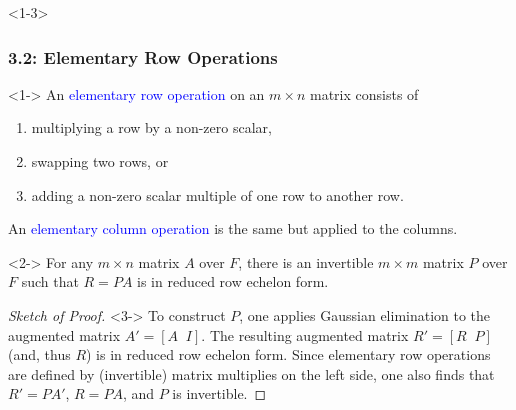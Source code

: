 \documentclass[10pt,english,aspectratio=169]{beamer}
\begin{document}
\begin{frame}

\end{frame}

\begin{frame}<1-3> \frametitle{3.2: Elementary Row Operations}

\vspace{-1.5mm}

\begin{definition}<1->
An \textcolor{blue}{elementary row operation} on an $m \times n$ matrix consists of
\begin{enumerate}
\setlength\itemsep{0.5mm}
\item multiplying a row by a non-zero scalar,
\item swapping two rows, or
\item adding a non-zero scalar multiple of one row to another row.
\end{enumerate}
An \textcolor{blue}{elementary column operation} is the same but applied to the columns.
\end{definition}

\vspace{-0.5mm}

\begin{lemma}<2->
For any $m\times n$ matrix $A$ over $F$, there is an invertible $m \times m$ matrix $P$ over $F$ such that $R=PA$ is in reduced row echelon form.
\end{lemma}

\vspace{-0.5mm}

\begin{proof}[Sketch of Proof]<3->
To construct $P$, one applies Gaussian elimination to the augmented matrix $A' = [A \;\; I]$.
The resulting augmented matrix $R' = [R \;\; P]$ (and, thus $R$) is in reduced row echelon form.
Since elementary row operations are defined by (invertible) matrix multiplies on the left side, one also finds that $R' = P A'$, $R = PA$, and $P$ is invertible.
\end{proof}


\end{frame}
\end{document}
